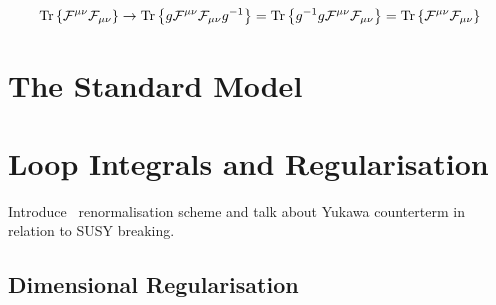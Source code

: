 \documentclass[../main.tex]{subfiles}
\begin{document}
\begin{temporary}
    \begin{equation}
        \operatorname{Tr}\left\{\mathcal{F}^{\mu\nu} \mathcal{F}_{\mu\nu}\right\} \to \operatorname{Tr}\left\{g \mathcal{F}^{\mu\nu} \mathcal{F}_{\mu\nu} g^{-1}\right\} = \operatorname{Tr}\left\{g^{-1} g \mathcal{F}^{\mu\nu} \mathcal{F}_{\mu\nu}\right\} = \operatorname{Tr}\left\{\mathcal{F}^{\mu\nu} \mathcal{F}_{\mu\nu}\right\}
    \end{equation}
\end{temporary}

\section{The Standard Model}

\section{Loop Integrals and Regularisation}
\begin{TODO}
    \item Introduce \DRbar\ renormalisation scheme and talk about Yukawa counterterm in
    relation to SUSY breaking.
\end{TODO}

\subsection{Dimensional Regularisation}
\end{document}
